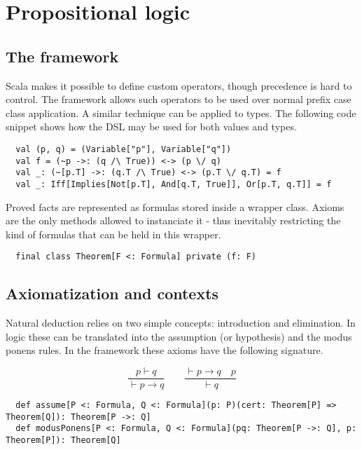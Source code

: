\documentclass[acmlarge]{acmart}
\begin{document}
\section{Propositional logic}

\subsection{The framework}



Scala makes it possible to define custom operators, though precedence is hard to control. The framework allows such operators to be used over normal prefix case class application. A similar technique can be applied to types. The following code snippet shows how the DSL may be used for both values and types.

\begin{verbatim}
  val (p, q) = (Variable["p"], Variable["q"])
  val f = (~p ->: (q /\ True)) <-> (p \/ q)
  val _: (~[p.T] ->: (q.T /\ True) <-> (p.T \/ q.T) = f
  val _: Iff[Implies[Not[p.T], And[q.T, True]], Or[p.T, q.T]] = f
\end{verbatim}

Proved facts are represented as formulas stored inside a wrapper class. Axioms are the only methods allowed to instanciate it - thus inevitably restricting the kind of formulas that can be held in this wrapper.

\begin{verbatim}
  final class Theorem[F <: Formula] private (f: F)
\end{verbatim}

\subsection{Axiomatization and contexts}

Natural deduction relies on two simple concepts: introduction and elimination. In logic these can be translated into the assumption (or hypothesis) and the modus ponens rules. In the framework these axioms have the following signature.

\[
\frac{p \vdash q}{\vdash p \rightarrow q} \qquad \frac{\vdash p \rightarrow q \quad p}{\vdash q}
\]

\begin{verbatim}
  def assume[P <: Formula, Q <: Formula](p: P)(cert: Theorem[P] => Theorem[Q]): Theorem[P ->: Q]
  def modusPonens[P <: Formula, Q <: Formula](pq: Theorem[P ->: Q], p: Theorem[P]): Theorem[Q]
\end{verbatim}
\end{document}
